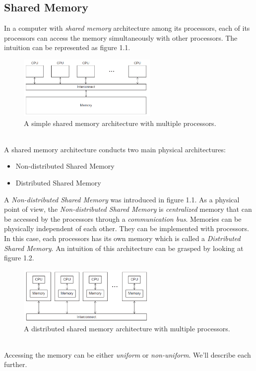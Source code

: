 \documentclass[12pt]{article}
\numberwithin{equation}{section}
\numberwithin{table}{section}
\numberwithin{figure}{section}
\begin{document}
\subsection*{Shared Memory}
In a computer with \textit{shared memory} architecture among its processors, each of its processors can access the memory simultaneously with other processors. The intuition can be represented as figure 1.1.
\begin{figure}[!h]\centering
	\includegraphics[width=0.6\textwidth]{Shared_memory_1.png}
	\caption{A simple shared memory architecture with multiple processors.}
	\label{figsolplot}
\end{figure}\\
A shared memory architecture conducts two main physical architectures:
\begin{itemize}
	\item Non-distributed Shared Memory
	\item Distributed Shared Memory
\end{itemize}
A \textit{Non-distributed Shared Memory} was introduced in figure 1.1. As a physical point of view, the \textit{Non-distributed Shared Memory} is \textit{centralized} memory that can be accessed by the processors through a \textit{communication bus}.
Memories can be physically independent of each other. They can be implemented with processors. In this case, each processors has its own memory which is called a \textit{Distributed Shared Memory}. An intuition of this architecture can be grasped by looking at figure 1.2.
\begin{figure}[!h]\centering
	\includegraphics[width=0.6\textwidth]{Shared_memory_2.png}
	\caption{A distributed shared memory architecture with multiple processors.}
	\label{figsolplot}
\end{figure}\\
Accessing the memory can be either \textit{uniform} or \textit{non-uniform}. We'll describe each further.
\end{document}
